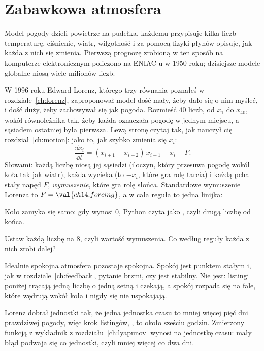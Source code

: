 \section{Zabawkowa atmosfera}
\label{sec:ch14-toy}

\noindent
Model pogody dzieli powietrze na pudełka, każdemu przypisuje kilka liczb
\dash{} temperaturę, ciśnienie, wiatr, wilgotność \dash{} i za pomocą fizyki
płynów opisuje, jak każda z nich się zmienia. Pierwszą prognozę zrobioną w
ten sposób na komputerze elektronicznym policzono na ENIAC-u w 1950 roku;
dzisiejsze modele globalne niosą wiele milionów liczb.

W 1996 roku Edward Lorenz, którego trzy równania poznałeś w
rozdziale~\ref{ch:lorenz}, zaproponował model dość mały, żeby dało się o nim
myśleć, i dość duży, żeby zachowywał się jak pogoda. Rozmieść $40$ liczb, od
$x_1$ do $x_{40}$, wokół równoleżnika tak, żeby każda oznaczała pogodę w
jednym miejscu, a sąsiadem ostatniej była pierwsza. Lewą stronę czytaj tak,
jak nauczył cię rozdział~\ref{ch:motion}: jako to, jak szybko zmienia się
$x_i$:
\[ \frac{\dd x_i}{\dd t} = (x_{i+1} - x_{i-2})\, x_{i-1} - x_i + F . \]
Słowami: każdą liczbę niosą jej sąsiedzi (iloczyn, który przesuwa pogodę
wokół koła tak jak wiatr), każda wycieka (to $-x_i$, które gra rolę tarcia)
i każdą pcha stały napęd $F$, \emph{wymuszenie}, które gra rolę słońca.
Standardowe wymuszenie Lorenza to $F = \val{ch14.forcing}$, a w
 cała reguła to jedna linijka:


\noindent
Koło zamyka się samo: gdy  wynosi $0$, Python czyta
 jako , czyli drugą liczbę od końca.

\begin{think}
Ustaw każdą liczbę na $8$, czyli wartość wymuszenia. Co według reguły każda
z nich zrobi dalej?
\end{think}
Idealnie spokojna atmosfera pozostaje spokojna. Spokój jest punktem stałym
i, jak w rozdziale~\ref{ch:feedback}, pytanie brzmi, czy jest stabilny. Nie
jest: listingi poniżej trącają jedną liczbę o jedną setną i czekają, a
spokój rozpada się na fale, które wędrują wokół koła i nigdy się nie
uspokajają.

Lorenz dobrał jednostki tak, że jedna jednostka czasu to mniej więcej pięć
dni prawdziwej pogody, więc krok listingów, , to około sześciu
godzin. Zmierzony funkcją  z  wykładnik z
rozdziału~\ref{ch:lyapunov} wynosi  na jednostkę czasu:
mały błąd podwaja się co  jednostki, czyli mniej więcej co
dwa dni.

